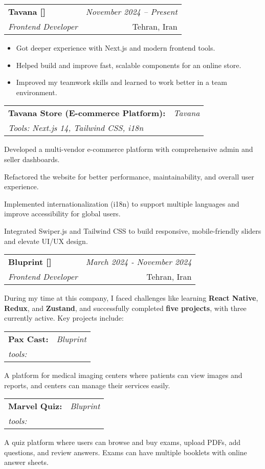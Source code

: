 \documentclass[a4paper,11pt]{article}
\makeatletter
\newcommand{\resumeSubheading}[4]{
\vspace{0.5mm}\item
    \begin{tabular*}{0.98\textwidth}[t]{l@{\extracolsep{\fill}}r}
        \textbf{#1} & \textit{\footnotesize{#4}} \\
        \textit{\footnotesize{#3}} &  \footnotesize{#2}\\
    \end{tabular*}
    \vspace{-2.4mm}
}
\newcommand{\resumeItemListStart}{\begin{itemize}[leftmargin=*,labelsep=1mm,itemsep=0.5mm]}
\newcommand{\resumeItemListEnd}{\end{itemize}\vspace{-2mm}}
\makeatother
\begin{document}
\resumeSubheading
    {{Tavana [\href{https://tavanastore.ir/}{\faIcon{globe}}]}}{Tehran, Iran}
    {Frontend Developer}{November 2024 – Present}
    \vspace{2mm}
    \resumeItemListStart
        \item Got deeper experience with Next.js and modern frontend tools.
        \item Helped build and improve fast, scalable components for an online store.
                \item Improved my teamwork skills and learned to work better in a team environment.
    \resumeItemListEnd
    \vspace{2mm}

\resumeSubheading
  {Tavana Store (E-commerce Platform):}{} 
  {Tools: Next.js 14, Tailwind CSS, i18n }{Tavana}
  \item Developed a multi-vendor e-commerce platform with comprehensive admin and seller dashboards.
  \item Refactored the  website  for better performance, maintainability, and overall user experience.
  \item Implemented internationalization (i18n) to support multiple languages and improve accessibility for global users.
  \item Integrated Swiper.js and Tailwind CSS to build responsive, mobile-friendly sliders and elevate UI/UX design.



    \vspace{10mm}

  \resumeSubheading
      {{Bluprint [\href{https://bluprint.ir/}{\faIcon{globe}}]}}{Tehran, Iran}
      {Frontend Developer}{March 2024 - November 2024}
      \resumeItemListStart
      \vspace{6mm}
During my time at this company, I faced challenges like learning \textbf{React Native}, \textbf{Redux}, and \textbf{Zustand}, and successfully completed \textbf{five projects}, with three currently active. Key projects include:
      \resumeItemListEnd 
      \vspace{2mm}
\resumeSubheading  {Pax Cast:}{}
{tools:}{Bluprint} 
  \item  A platform for medical imaging centers where patients can view images and reports, and centers can manage their services easily.

\resumeSubheading {Marvel Quiz:} {}
{tools:}{Bluprint} 

  \item A quiz platform where users can browse and buy exams, upload PDFs, add questions, and review answers. Exams can have multiple booklets with online answer sheets.
\end{document}
